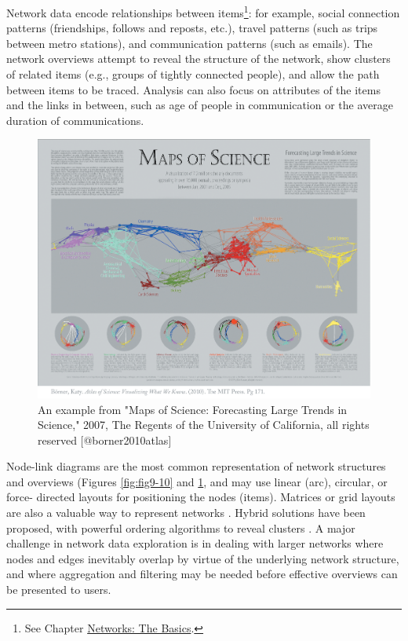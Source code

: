 \documentclass[]{krantz}
\begin{document}
Network data encode relationships between items\footnote{See Chapter
  \protect\hyperlink{chap:networks}{Networks: The Basics}.}: for
example, social connection patterns (friendships, follows and reposts,
etc.), travel patterns (such as trips between metro stations), and
communication patterns (such as emails). The network overviews attempt
to reveal the structure of the network, show clusters of related items
(e.g., groups of tightly connected people), and allow the path between
items to be traced. Analysis can also focus on attributes of the items
and the links in between, such as age of people in communication or the
average duration of communications.

\begin{figure}

{\centering \includegraphics[width=0.9\linewidth]{ChapterViz/figures/fig9-10b} 

}

\caption{An example from "Maps of Science: Forecasting Large Trends in Science," 2007, The Regents of the University of California, all rights reserved [@borner2010atlas]}\label{fig:fig9-10b}
\end{figure}

Node-link diagrams are the most common representation of network
structures and overviews (Figures \ref{fig:fig9-10} and
\ref{fig:fig9-10b}, and may use linear (arc), circular, or force-
directed layouts for positioning the nodes (items). Matrices or grid
layouts are also a valuable way to represent networks
\citep{henry2006matrixexplorer}. Hybrid solutions have been proposed,
with powerful ordering algorithms to reveal clusters
\citep{hansen2010analyzing}. A major challenge in network data
exploration is in dealing with larger networks where nodes and edges
inevitably overlap by virtue of the underlying network structure, and
where aggregation and filtering may be needed before effective overviews
can be presented to users.
\end{document}
